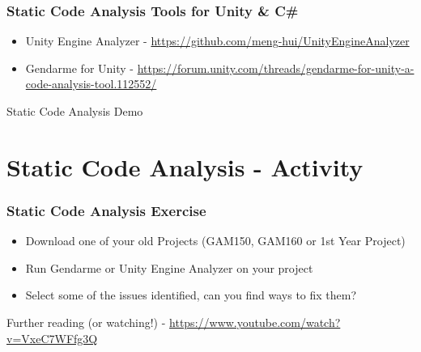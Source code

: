 \begin{frame}
	\frametitle{Static Code Analysis Tools for Unity \& C\#}
	\begin{itemize}
		\item Unity Engine Analyzer - \url{https://github.com/meng-hui/UnityEngineAnalyzer}
		\item Gendarme for Unity - \url{https://forum.unity.com/threads/gendarme-for-unity-a-code-analysis-tool.112552/}
	\end{itemize}
\end{frame}

\begin{frame}
	\begin{center}
		Static Code Analysis Demo
	\end{center}
\end{frame}

\section{Static Code Analysis - Activity}

\begin{frame}
	\frametitle{Static Code Analysis Exercise}
	\begin{itemize}
		\item Download one of your old Projects (GAM150, GAM160 or 1st Year Project)
		\item Run Gendarme or Unity Engine Analyzer on your project
		\item Select some of the issues identified, can you find ways to fix them?
	\end{itemize}
\end{frame}

\begin{frame}
	\begin{center} 
		Further reading (or watching!) - \url{https://www.youtube.com/watch?v=VxeC7WFfg3Q}
	\end{center}
\end{frame}
